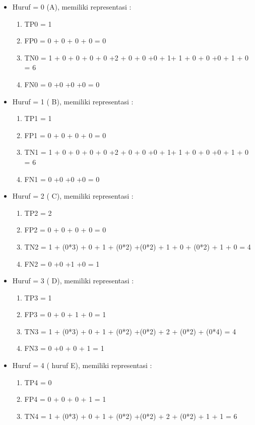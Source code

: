 \begin{enumerate}
\begin{enumerate}
\begin{itemize}
    \item Huruf = 0 (A), memiliki representasi :
    \begin{enumerate}
        \item TP0 = 1
        \item FP0 = 0 + 0 + 0 + 0 = 0
        \item TN0 = 1 + 0 + 0 + 0 + 0 +2 + 0 + 0 +0 + 1+ 1 + 0 + 0 +0 + 1 + 0 = 6
        \item FN0  = 0 +0 +0 +0 = 0
    \end{enumerate}
    \item Huruf = 1 ( B), memiliki representasi :
    \begin{enumerate}
        \item TP1 = 1
        \item FP1 = 0 + 0 + 0 + 0 = 0
        \item TN1 = 1 + 0 + 0 + 0 + 0 +2 + 0 + 0 +0 + 1+ 1 + 0 + 0 +0 + 1 + 0 = 6
        \item FN1  = 0 +0 +0 +0 = 0
    \end{enumerate}
    \item Huruf = 2 ( C), memiliki representasi :
    \begin{enumerate}
        \item TP2 = 2
        \item FP2 = 0 + 0 + 0 + 0 = 0
        \item TN2 = 1 + (0*3) + 0 + 1 + (0*2) +(0*2) + 1 + 0 + (0*2) + 1 + 0 = 4
        \item FN2  = 0 +0 +1 +0 = 1
    \end{enumerate}
    \item Huruf = 3 ( D), memiliki representasi :
    \begin{enumerate}
        \item TP3 = 1
        \item FP3 = 0 + 0 + 1 + 0 = 1
        \item TN3 = 1 + (0*3) + 0 + 1 + (0*2) +(0*2) + 2 + (0*2) + (0*4) = 4
        \item FN3  = 0 +0 + 0 + 1 = 1
    \end{enumerate}
    \item Huruf = 4 ( huruf E), memiliki representasi :
    \begin{enumerate}
        \item TP4 = 0
        \item FP4 = 0 + 0 + 0 + 1 = 1
        \item TN4 = 1 + (0*3) + 0 + 1 + (0*2) +(0*2) + 2 + (0*2) + 1 + 1 = 6

\end{enumerate}
\end{itemize}
\end{enumerate}
\end{enumerate}
